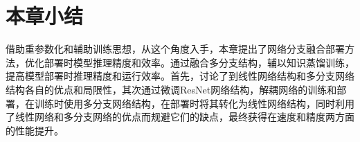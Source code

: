 \section{本章小结}

借助重参数化和辅助训练思想，从这个角度入手，本章提出了网络分支融合部署方法，优化部署时模型推理精度和效率。通过融合多分支结构，辅以知识蒸馏训练，提高模型部署时推理精度和运行效率。首先，讨论了到线性网络结构和多分支网络结构各自的优点和局限性，其次通过微调ResNet网络结构，解耦网络的训练和部署，在训练时使用多分支网络结构，在部署时将其转化为线性网络结构，同时利用了线性网络和多分支网络的优点而规避它们的缺点，最终获得在速度和精度两方面的性能提升。



